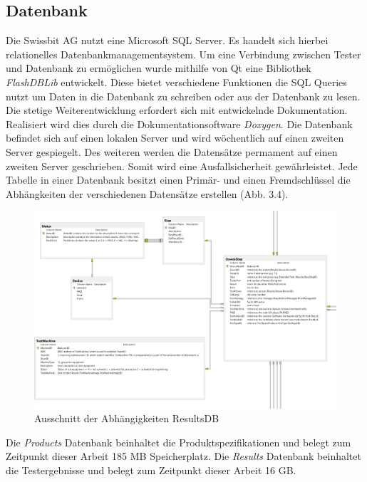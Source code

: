 	\vspace{5mm}
	
\subsection{Datenbank}
Die Swissbit AG nutzt eine Microsoft \ac{SQL} Server. Es handelt sich hierbei relationelles Datenbankmanagementsystem. Um eine Verbindung zwischen Tester und Datenbank zu ermöglichen wurde mithilfe von Qt eine Bibliothek \textit{FlashDBLib} entwickelt. Diese bietet verschiedene Funktionen die \ac{SQL} Queries nutzt um Daten in die Datenbank zu schreiben oder aus der Datenbank zu lesen. Die stetige Weiterentwicklung erfordert sich mit entwickelnde Dokumentation. Realisiert wird dies durch die Dokumentationsoftware \textit{Doxygen}. Die Datenbank befindet sich auf einen lokalen Server und wird wöchentlich auf einen zweiten Server gespiegelt. Des weiteren werden die Datensätze permament auf einen zweiten Server geschrieben. Somit wird eine Ausfallsicherheit gewährleistet. Jede Tabelle in einer Datenbank besitzt einen Primär- und einen Fremdschlüssel die Abhängkeiten der verschiedenen Datensätze erstellen (Abb. 3.4). 
\begin{figure}[!htbp]
\centering
\includegraphics[scale=0.8]{images/resultsdb}
\caption{Ausschnitt der Abhängigkeiten ResultsDB}
\label{fig:FlashDB - Results Datenbank}
\end{figure}
Die \textit{Products} Datenbank beinhaltet die Produktspezifikationen und belegt zum Zeitpunkt dieser Arbeit 185 MB Speicherplatz. Die \textit{Results} Datenbank beinhaltet die Testergebnisse und belegt zum Zeitpunkt dieser Arbeit 16 GB.
\newpage

